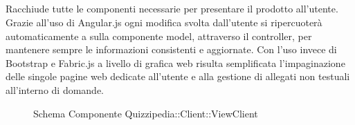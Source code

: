 \subsection{}
Racchiude tutte le componenti necessarie per presentare il prodotto all'utente.
Grazie all'uso di Angular.js ogni modifica svolta dall'utente si ripercuoterà automaticamente a sulla componente model, attraverso il controller, per mantenere sempre le informazioni consistenti e aggiornate.
Con l'uso invece di Bootstrap e Fabric.js a livello di grafica web risulta semplificata l'impaginazione delle singole pagine web dedicate all'utente e alla gestione di allegati non testuali all'interno di domande.
\begin{figure}[H]
\centering
\noindent{}
\caption[Schema Componente Quizzipedia::Client::ViewClient]{Schema Componente Quizzipedia::Client::ViewClient}
\end{figure}
